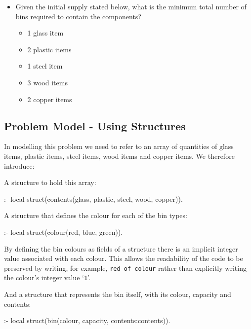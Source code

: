 \begin{itemize}
\item Given the initial supply stated below, what is the minimum total
  number of bins required to contain the components?
\begin{itemize}
\item 1 glass item
\item 2 plastic items
\item 1 steel item
\item 3 wood items
\item 2 copper items
\end{itemize}
\end{itemize}

\subsection{Problem Model - Using Structures}

In modelling this problem we need to refer to an array of quantities
of glass items, plastic items, steel items, wood items and copper
items. We therefore introduce:

A structure to hold this array:
\begin{code}
:- local struct(contents(glass, plastic, steel, wood, copper)).
\end{code}

A structure that defines the colour for each of the bin types:
\begin{code}
:- local struct(colour(red, blue, green)).
\end{code}

By defining the bin colours as fields of a structure there is an implicit
integer value associated with each colour. This allows the readability of the code
to be preserved by writing, for example, {\tt red of colour} rather than
explicitly writing the colour's integer value `{\tt 1}'.

And a structure that represents the bin itself, with its colour, 
capacity and contents:
\begin{code}
:- local struct(bin(colour, capacity, contents:contents)).
\end{code}


